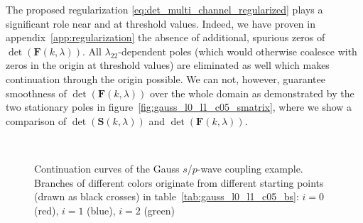 \documentclass[mathpazo]{cicp}
\begin{document}
The proposed regularization \eqref{eq:det_multi_channel_regularized} plays a significant role near and at threshold values. Indeed, we have proven in appendix~\ref{app:regularization} the absence of 
additional, spurious zeros of $\det(\mathbold{F}(k,\lambda))$. All $\lambda_{22}$-dependent poles (which would otherwise coalesce with zeros in the origin at threshold values) are 
eliminated as well which makes continuation through the origin possible. We can not, however, guarantee smoothness of $\det(\mathbold{F}(k,\lambda))$ 
over the whole domain as demonstrated by the two stationary poles in figure~\ref{fig:gauss_l0_l1_c05_smatrix}, where we show a comparison 
of $\det(\mathbold{S}(k,\lambda))$ and $\det(\mathbold{F}(k,\lambda))$.

\begin{figure}[h!]
	\centering
	\\
	\caption{Continuation curves of the Gauss $s$/$p$-wave coupling example. Branches of different colors originate from different starting points 
	(drawn as black crosses) in table~\ref{tab:gauss_l0_l1_c05_bs}: $i=0$ (red), $i=1$ (blue), $i=2$ (green)}
	\label{fig:gauss_l0_l1_c05_continuation}
\end{figure}
\end{document}
